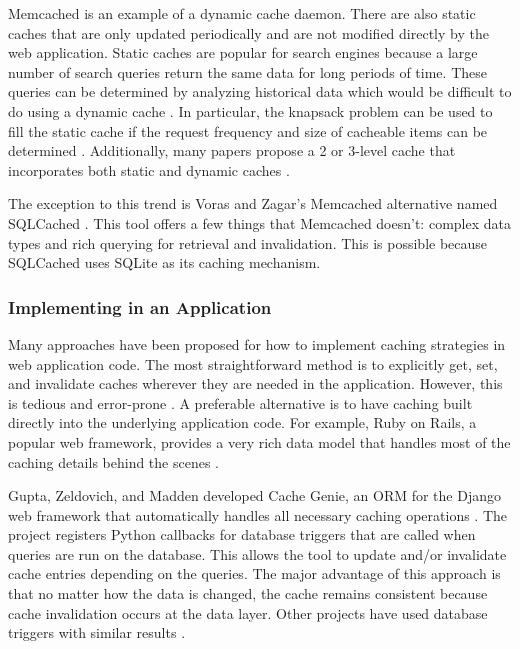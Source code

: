 \documentclass[12pt]{ucthesis}
\begin{document}
\textsf{Memcached} is an example of a dynamic cache daemon.
There are also static caches that are only updated periodically and are not modified directly by the web application.
Static caches are popular for search engines because a large number of search queries return the same data for long periods of time.
These queries can be determined by analyzing historical data which would be difficult to do using a dynamic cache \cite{designTradeOffsSearchEngine}.
In particular, the knapsack problem can be used to fill the static cache if the request frequency and size of cacheable items can be determined \cite{designTradeOffsSearchEngine}.
Additionally, many papers propose a 2 or 3-level cache that incorporates both static and dynamic caches \cite{cacheAdmissionPolicies, designTradeOffsSearchEngine}.

The exception to this trend is Voras and Zagar's \textsf{Memcached} alternative named SQLCached \cite{sqlCached}.
This tool offers a few things that \textsf{Memcached} doesn't: complex data types and rich querying for retrieval and invalidation.
This is possible because SQLCached uses SQLite as its caching mechanism.

\subsubsection{Implementing in an Application}
Many approaches have been proposed for how to implement caching strategies in web application code.
The most straightforward method is to explicitly get, set, and invalidate caches wherever they are needed in the application.
However, this is tedious and error-prone \cite{keyBasedCacheExpiration, triggerBasedORM}.
A preferable alternative is to have caching built directly into the underlying application code.
For example, Ruby on Rails, a popular web framework, provides a very rich data model that handles most of the caching details behind the scenes \cite{keyBasedCacheExpiration}.

Gupta, Zeldovich, and Madden developed Cache Genie, an ORM for the Django web framework that automatically handles all necessary caching operations \cite{triggerBasedORM}.
The project registers Python callbacks for database triggers that are called when queries are run on the database.
This allows the tool to update and/or invalidate cache entries depending on the queries.
The major advantage of this approach is that no matter how the data is changed, the cache remains consistent because cache invalidation occurs at the data layer.
Other projects have used database triggers with similar results \cite{scalableConsistentCaching}.
\end{document}
